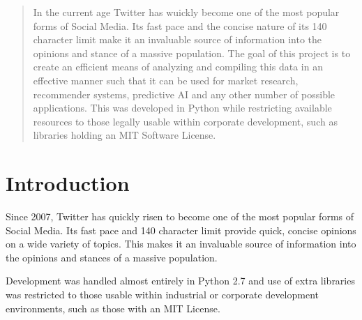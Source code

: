 \documentclass[12pt,a4paper]{report}
\begin{document}
\begin{abstract}
  In the current age Twitter has wuickly become one of the most popular forms of Social Media. Its fast pace and the concise nature of its 140 character limit make it an invaluable source of information into the opinions and stance of a massive population. The goal of this project is to create an efficient means of analyzing and compiling this data in an effective manner such that it can be used for market research, recommender systems, predictive AI and any other number of possible applications. This was developed in Python while restricting available resources to those legally usable within corporate development, such as libraries holding an MIT Software License.
\end{abstract}

\tableofcontents

\listoffigures

\chapter{Introduction}
  Since 2007, Twitter has quickly risen to become one of the most popular forms of Social Media. Its fast pace and 140 character limit provide quick, concise opinions on a wide variety of topics. This makes it an invaluable source of information into the opinions and stances of a massive population.
  \par
  Development was handled almost entirely in Python 2.7\cite{Python2Docs} and use of extra libraries was restricted to those usable within industrial or corporate development environments, such as those with an MIT License\cite{MITLicense}.
\end{document}
